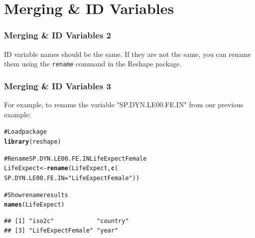 \documentclass{beamer}\usepackage{graphicx, color}
\makeatletter
\newcommand{\hlfunctioncall}[1]{\textcolor[rgb]{0.501960784313725,0,0.329411764705882}{\textbf{#1}}}%
\newcommand{\hlstring}[1]{\textcolor[rgb]{0.6,0.6,1}{#1}}%
\newcommand{\hlcomment}[1]{\textcolor[rgb]{0.180392156862745,0.6,0.341176470588235}{#1}}%
\newenvironment{kframe}{%
 \def\at@end@of@kframe{}%
 \ifinner\ifhmode%
  \def\at@end@of@kframe{\end{minipage}}%
  \begin{minipage}{\columnwidth}%
 \fi\fi%
 \def\FrameCommand##1{\hskip\@totalleftmargin \hskip-\fboxsep
 \colorbox{shadecolor}{##1}\hskip-\fboxsep
     \hskip-\linewidth \hskip-\@totalleftmargin \hskip\columnwidth}%
 \MakeFramed {\advance\hsize-\width
   \@totalleftmargin\z@ \linewidth\hsize
   \@setminipage}}%
 {\par\unskip\endMakeFramed%
 \at@end@of@kframe}
\newenvironment{knitrout}{}{} %
\makeatother
\begin{document}

\section{Merging \& ID Variables}


\begin{frame}[fragile]
  \frametitle{Merging \& ID Variables 2}
  ID variable names should be the same. If they are not the same, you can rename them using the \texttt{rename} command in the Reshape package. \\[0.5cm]
\end{frame}

\begin{frame}[fragile]
  \frametitle{Merging \& ID Variables 3}
  For example, to rename the variable "SP.DYN.LE00.FE.IN" from our previous example:
\begin{knitrout}
\color{fgcolor}\begin{kframe}
\begin{alltt}
\hlcomment{# Load package}
\hlfunctioncall{library}(reshape)

\hlcomment{# Rename SP.DYN.LE00.FE.IN LifeExpectFemale}
LifeExpect <- \hlfunctioncall{rename}(LifeExpect, \hlfunctioncall{c}(
  SP.DYN.LE00.FE.IN = \hlstring{"LifeExpectFemale"}))

\hlcomment{# Show rename results}
\hlfunctioncall{names}(LifeExpect)
\end{alltt}
\begin{verbatim}
## [1] "iso2c"            "country"         
## [3] "LifeExpectFemale" "year"
\end{verbatim}
\end{kframe}
\end{knitrout}

\end{frame}
\end{document}
